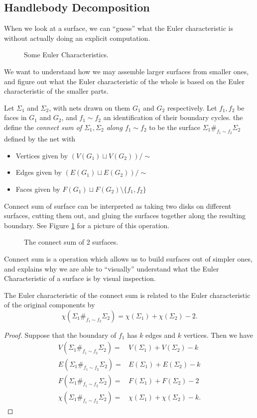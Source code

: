 \subsection{Handlebody Decomposition}
When we look at a surface, we can ``guess'' what the Euler characteristic is without actually doing an explicit computation. 
\begin{figure}[h]
\centering

\caption{Some Euler Characteristics.}
\end{figure}
We want to understand how we may assemble larger surfaces from smaller ones, and figure out what the Euler characteristic of the whole is based on the Euler characteristic of the smaller parts. 
\begin{definition}Let $\Sigma_1$ and $\Sigma_2$, with nets drawn on them $G_1$ and $G_2$ respectively. Let $f_1, f_2$ be faces in $G_1$ and $G_2$, and $f_1\sim f_2$ an identification of their boundary cycles.  the define the \emph{connect sum of $\Sigma_1, \Sigma_2$ along $f_1\sim f_2$} to be the surface $\Sigma_1\#_{f_1\sim f_2} \Sigma_2$ defined by the net with  
\begin{itemize}
\item Vertices given by $(V(G_1)\sqcup V(G_2))/\sim$
\item Edges given by $(E(G_1)\sqcup E(G_2))/\sim$
\item Faces given by $F(G_1)\sqcup F(G_2)\setminus \{f_1, f_2\}$
\end{itemize}
\end{definition}
Connect sum of surface can be interpreted as taking two disks on different surfaces, cutting them out, and gluing the surfaces together along the resulting boundary. See Figure \ref{fig:connectsum} for a picture of this operation. 
\begin{figure}
\centering

\caption{The connect sum of 2 surfaces.}
\label{fig:connectsum}
\end{figure}
Connect sum is a operation which allows us to build surfaces out of simpler ones, and explains why we are able to ``visually'' understand what the Euler Characteristic of a surface is by visual inspection.
\begin{claim}
The Euler characteristic of the connect sum is related to the Euler characteristic of the original components by 
\[\chi(\Sigma_1\#_{f_1\sim f_2} \Sigma_2)=\chi(\Sigma_1)+\chi(\Sigma_2)-2.\]
\end{claim}
\begin{proof}
Suppose that the boundary of $f_1$ has $k$ edges and $k$ vertices. Then we have 
\begin{align*}
V(\Sigma_1\#_{f_1\sim f_2} \Sigma_2)=&V(\Sigma_1)+V(\Sigma_2)-k\\
E(\Sigma_1\#_{f_1\sim f_2} \Sigma_2)=&E(\Sigma_1)+E(\Sigma_2)-k\\
F(\Sigma_1\#_{f_1\sim f_2} \Sigma_2)=&F(\Sigma_1)+F(\Sigma_2)-2\\
\chi(\Sigma_1\#_{f_1\sim f_2} \Sigma_2)=&\chi(\Sigma_1)+\chi(\Sigma_2)-k.
\end{align*}
\end{proof}
